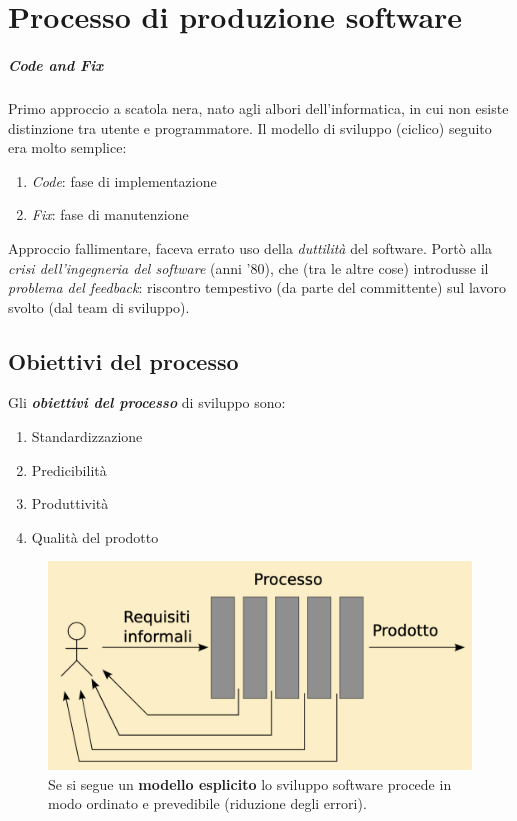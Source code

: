 \chapter{Processo di produzione software}

\paragraph{Code and Fix} Primo approccio a scatola nera, nato agli albori dell'informatica, in cui non esiste distinzione tra utente e programmatore.
Il modello di sviluppo (ciclico) seguito era molto semplice:
\begin{enumerate}
    \item \textit{Code}: fase di implementazione
    \item \textit{Fix}: fase di manutenzione
\end{enumerate}
Approccio fallimentare, faceva errato uso della \textit{duttilità} del software. Portò alla \textit{crisi dell'ingegneria del software} (anni '80), che (tra le altre cose) introdusse il \textit{problema del feedback}: riscontro tempestivo (da parte del committente) sul lavoro svolto (dal team di sviluppo).

\section{Obiettivi del processo}

Gli \textbf{\textit{obiettivi del processo}} di sviluppo sono:
\begin{enumerate}
    \item Standardizzazione
    \item Predicibilità
    \item Produttività
    \item Qualità del prodotto
\end{enumerate}

\begin{figure}[H]
    \centering
    \includegraphics[width=0.8\linewidth]{assets/processo_esplicito.png}
    \caption{Se si segue un \textbf{modello esplicito} lo sviluppo software procede in modo ordinato e prevedibile (riduzione degli errori).}
\end{figure}

